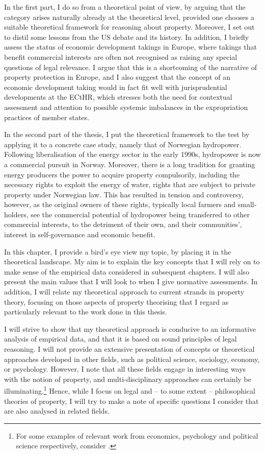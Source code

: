 In the first part, I do so from a theoretical point of view, by arguing that the category arises naturally already at the theoretical level, provided one chooses a suitable theoretical framework for reasoning about property. Moreover, I set out to distil some lessons from the US debate and its history. In addition, I briefly assess the status of economic development takings in Europe, where takings that benefit commercial interests are often not recognised as raising any special questions of legal relevance. I argue that this is a shortcoming of the narrative of property protection in Europe, and I also suggest that the concept of an economic development taking would in fact fit well with jurisprudential developments at the ECtHR, which stresses both the need for contextual assessment and attention to possible systemic imbalances in the expropriation practices of member states.

In the second part of the thesis, I put the theoretical framework to the test by applying it to a concrete case study, namely that of Norwegian hydropower. Following liberalisation of the energy sector in the early 1990s, hydropower is now a commercial pursuit in Norway. Moreover, there is a long tradition for granting energy producers the power to acquire property compulsorily, including the necessary rights to exploit the energy of water, rights that are subject to private property under Norwegian law. This has resulted in tension and controversy, however, as the original owners of these rights, typically local farmers and small-holders, see the commercial potential of hydropower being transferred to other commercial interests, to the detriment of their own, and their communities', interest in self-governance and economic benefit.

In this chapter, I provide a bird's eye view  my topic, by placing it in the theoretical landscape. My aim is to explain the key concepts that I will rely on to make sense of the empirical data considered in subsequent chapters. I will also present the main values that I will look to when I give normative assessments. In addition, I will relate my theoretical approach to current strands in property theory, focusing on those aspects of property theorising that I regard as particularly relevant to the work done in this thesis.

I will strive to show that my theoretical approach is conducive to an informative analysis of empirical data, and that it is based on sound principles of legal reasoning. I will not provide an extensive presentation of concepts or theoretical approaches developed in other fields, such as political science, sociology, economy, or psychology. However, I note that all these fields engage in interesting ways with the notion of property, and multi-disciplinary approaches can certainly be illuminating.\footnote{For some examples of relevant work from economics, psychology and political science respectively, consider \cite{miceli11,nadler08,katz97,carruthers04}.} Hence, while I focus on legal and --  to some extent -- philosophical theories of property, I will try to make a note of specific questions I consider that are also analysed in related fields.

